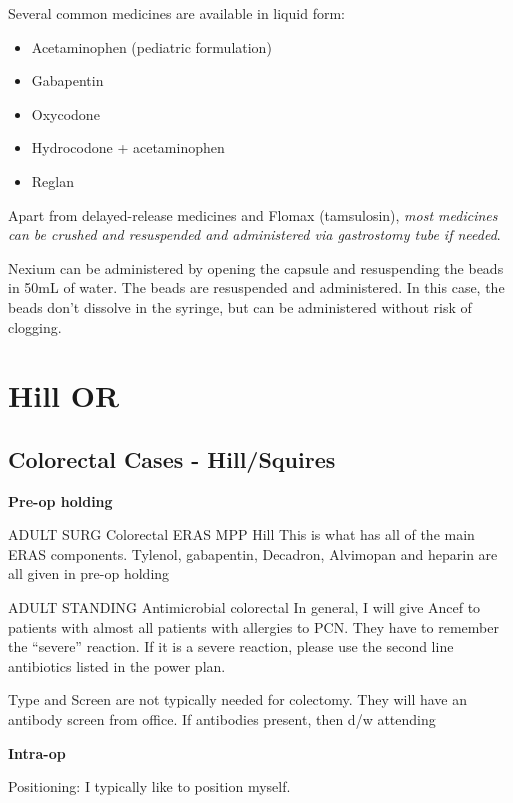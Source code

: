 \documentclass[
]{book}
\providecommand{\tightlist}{%
  \setlength{\itemsep}{0pt}\setlength{\parskip}{0pt}}
\begin{document}
Several common medicines are available in liquid form:

\begin{itemize}
\tightlist
\item
  Acetaminophen (pediatric formulation)
\item
  Gabapentin
\item
  Oxycodone
\item
  Hydrocodone + acetaminophen
\item
  Reglan
\end{itemize}

Apart from delayed-release medicines and Flomax (tamsulosin), \emph{most medicines can be crushed and resuspended and administered via gastrostomy tube if needed}.

Nexium can be administered by opening the capsule and resuspending the beads in 50mL of water. The beads are resuspended and administered. In this case, the beads don't dissolve in the syringe, but can be administered without risk of clogging.

\hypertarget{part-hill-or}{%
\part*{Hill OR}\label{part-hill-or}}

\hypertarget{colorectal-cases---hillsquires}{%
\chapter{Colorectal Cases - Hill/Squires}\label{colorectal-cases---hillsquires}}

\textbf{Pre-op holding}

ADULT SURG Colorectal ERAS MPP Hill This is what has all of the main ERAS components. Tylenol, gabapentin, Decadron, Alvimopan and heparin are all given in pre-op holding

ADULT STANDING Antimicrobial colorectal In general, I will give Ancef to patients with almost all patients with allergies to PCN. They have to remember the ``severe'' reaction. If it is a severe reaction, please use the second line antibiotics listed in the power plan.

Type and Screen are not typically needed for colectomy. They will have an antibody screen from office. If antibodies present, then d/w attending

\textbf{Intra-op}

Positioning: I typically like to position myself.
\end{document}
